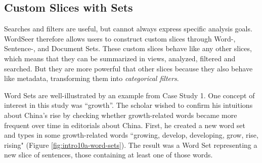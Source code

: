 \documentclass{sig-alternate}
\begin{document}
\subsection{Custom Slices with Sets}

Searches and filters are useful, but cannot always express  specific analysis goals. WordSeer therefore allows users to construct custom slices through Word-, Sentence-, and Document Sets. These custom slices behave like any other slices, which means that they can be summarized in views,  analyzed, filtered and searched. But they are more powerful that other slices because they also behave like metadata, transforming them into \emph{categorical filters}.

Word Sets are well-illustrated by an example from Case Study 1.  One concept of interest in this study was ``growth''. The scholar wished to confirm his intuitions about China's rise by checking whether  growth-related words became more frequent over time in editorials about China. First, he created a new word set and types in some growth-related words ``growing, develop, developing, grow, rise, rising" (Figure \ref{fig:intro10a-word-sets}). The result was a Word Set representing a new slice of sentences, those containing at least one of those words. 
\end{document}
